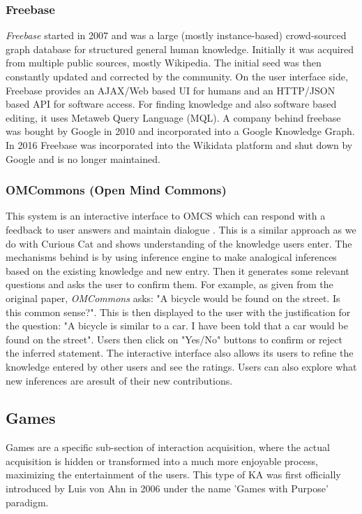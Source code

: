 \subsubsection{Freebase}
\label{section:r:freebase}
\emph{Freebase} started in 2007 \parencite{Bollacker2008} and was a large (mostly
instance-based) crowd-sourced graph database for structured general human 
knowledge. Initially it was acquired from multiple public sources, mostly 
Wikipedia. The initial seed was then constantly updated and corrected by the 
community. On the user interface side, Freebase provides an AJAX/Web based 
UI for humans and an HTTP/JSON based API for software access. For finding
knowledge and also software based editing, it uses Metaweb Query Language 
(MQL). A company behind freebase was bought by Google in 2010 and incorporated
into a Google Knowledge Graph. In 2016 Freebase was incorporated into the 
Wikidata platform and shut down by Google and is no longer maintained.

\subsubsection{OMCommons (Open Mind Commons)}
\label{section:r:omc}
This system is an interactive interface to OMCS which
can respond with a feedback to user answers and maintain dialogue 
\parencite{Speer2007}. This is a similar approach as we do with Curious Cat and
shows understanding of the knowledge users enter. The mechanisms behind is
by using inference engine to make analogical inferences based on the existing 
knowledge and new entry. Then it generates some relevant questions and asks 
the user to confirm them. For example, as given from the original paper, 
\emph{OMCommons} asks: "A bicycle would be found on the street. Is this common 
sense?". This is then displayed to the user with the justification for the 
question: "A bicycle is similar to a car. I have been told that a car would 
be found on the street". Users then click on "Yes/No" buttons to confirm or
reject the inferred statement. The interactive interface also allows its users 
to refine the knowledge entered by other users and see the ratings. Users can 
also explore what new inferences are aresult of their new contributions.

\subsection{Games}
\label{section:r:games}
Games are a specific sub-section of interaction acquisition, where the actual
acquisition is hidden or transformed into a much more enjoyable process, 
maximizing the entertainment of the users. This type of KA was first 
officially introduced by Luis von Ahn in 2006 \parencite{VonAhn2006,
VonAhn2008} under the name 'Games with Purpose' paradigm.

